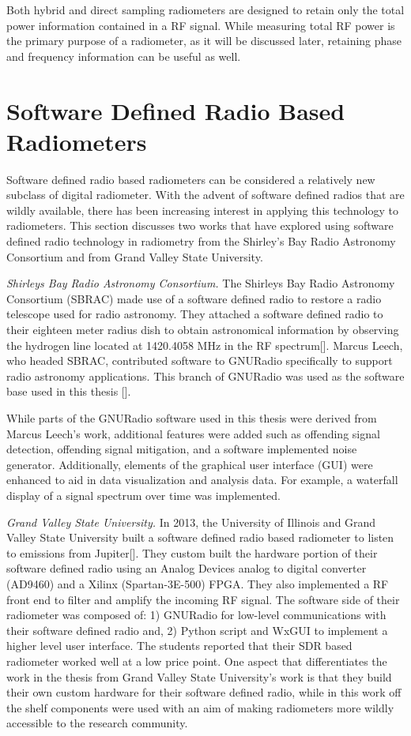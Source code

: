 Both hybrid and direct sampling radiometers are designed to retain only the total power information contained in a RF signal.  While measuring total RF power is the primary purpose of a radiometer, as it will be discussed later, retaining phase and frequency information can be useful as well.

\section{Software Defined Radio Based Radiometers}

Software defined radio based radiometers can be considered a relatively new subclass of digital radiometer.  With the advent of software defined radios that are wildly available, there has been increasing interest in applying this technology to radiometers.  This section discusses two works that have explored using software defined radio technology in radiometry from the Shirley's Bay Radio Astronomy Consortium and from Grand Valley State University.

\emph{Shirleys Bay Radio Astronomy Consortium.}  The Shirleys Bay Radio Astronomy Consortium (SBRAC) made use of a software defined radio to restore a radio telescope used for radio astronomy.  They attached a software defined radio to their eighteen meter radius dish to obtain astronomical information by observing the hydrogen line located at 1420.4058 MHz in the RF spectrum[\cite{Leech2007}].  Marcus Leech, who headed SBRAC, contributed software to GNURadio specifically to support radio astronomy applications.  This branch of GNURadio was used as the software base used in this thesis [\cite{Leech}].

While parts of the GNURadio software used in this thesis were derived from Marcus Leech's work, additional features were added such as offending signal detection, offending signal mitigation, and a software implemented noise generator.  Additionally, elements of the graphical user interface (GUI) were enhanced to aid in data visualization and analysis data.  For example, a waterfall display of a signal spectrum over time was implemented.

\emph{Grand Valley State University.}  In 2013, the University of Illinois and Grand Valley State University built a software defined radio based radiometer to listen to emissions from Jupiter[\cite{Behnke}].  They custom built the hardware portion of their software defined radio using an Analog Devices analog to digital converter (AD9460) and a Xilinx (Spartan-3E-500) FPGA.  They also implemented a RF front end to filter and amplify the incoming RF signal.  The software side of their radiometer was composed of: 1) GNURadio for low-level communications with their software defined radio and, 2) Python script and WxGUI to implement a higher level user interface.  The students reported that their SDR based radiometer worked well at a low price point.  One aspect that differentiates the work in the thesis from Grand Valley State University's work is that they build their own custom hardware for their software defined radio, while in this work off the shelf components were used with an aim of making radiometers more wildly accessible to the research community.

